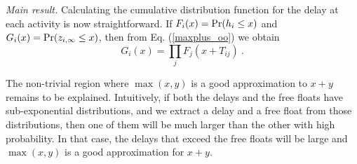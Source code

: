 \documentclass[reprint,aps,prl,amsmath,amssymb,superscriptaddress,showpacs]{revtex4-1}
\begin{document}
{\em Main result.} Calculating the cumulative distribution function for the delay at each activity is now straightforward. If $F_i(x)={\rm Pr}(h_i\leq x)$ and $G_i(x) = {\rm Pr}(z_{i,\infty}\leq x)$, then from Eq. (\ref{maxplus_oo}) we obtain
%
\begin{equation}
G_i(x) = \prod_{j} F_j(x+T_{ij})\ .
\label{CDF}
\end{equation}
%

The non-trivial region where $\max(x,y)$ is a good approximation to $x+y$ remains to be explained. Intuitively, if both the delays and the free floats have sub-exponential distributions, and we extract a delay and a free float from those distributions, then one of them will be much larger than the other with high probability. In that case, the delays that exceed the free floats will be large and $\max(x,y)$ is a good approximation for $x+y$.








\begin{figure}[t]
\caption{}
\label{fig}
\end{figure}







\end{document}
